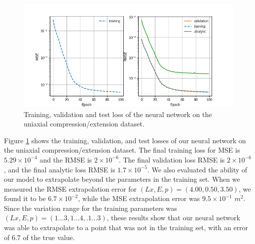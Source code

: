 \documentclass[oneside,a4paper,english,links]{amca}
\begin{document}
\begin{figure}[htpb!]
	\centering
	\includegraphics[width=1\textwidth]{Figures/Example1_losses.png}
	\caption{Training, validation and test loss of the neural network on the uniaxial compression/extension dataset.}
	\label{fig:train_loss}
	\end{figure}
 
Figure \ref{fig:train_loss} shows the training, validation, and test losses of our neural network on the uniaxial compression/extension dataset. The final training loss for MSE is $5.29\times10^{-4}$ and the RMSE is $2\times10^{-6}$. The final validation loss RMSE is $2\times10^{-6}$, and the final analytic loss RMSE is $1.7\times10^{-5}$.
We also evaluated the ability of our model to extrapolate beyond the parameters in the training set. When we measured the RMSE extrapolation error for $(Lx, E, p) = (4.00, 0.50, 3.50)$, we found it to be $6.7\times10^{-2}$, while the MSE extrapolation error was $9.5\times10^{-1}$ $m^2$. Since the variation range for the training parameters was $(Lx, E, p) = (1 \hdots 3, 1 \hdots 4, .1 \hdots 3)$, these results show that our neural network was able to extrapolate to a point that was not in the training set, with an error of 6.7 of the true value.
\end{document}
